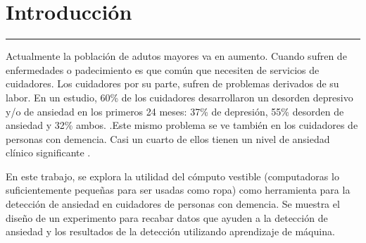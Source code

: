 
\chapter{Introducci\'on}\label{capit:cap1}
\vspace{-2.0325ex}%
\noindent
\rule{\textwidth}{0.5pt}
\vspace{-5.5ex}%
\newcommand{\pushline}{\Indp}


Actualmente la poblaci\'on de adutos mayores va en aumento. Cuando sufren de enfermedades o padecimiento es que com\'un que necesiten de servicios de cuidadores. Los cuidadores por su parte, sufren de problemas derivados de su labor. En un estudio, 60\% de los cuidadores desarrollaron un desorden depresivo y/o de ansiedad en los primeros 24 meses: 37\% de depresi\'on, 55\% desorden de ansiedad y 32\% ambos. \citep{Joling2014}.Este mismo problema se ve tambi\'en en los cuidadores de personas con demencia.  Casi un cuarto de ellos tienen un nivel de ansiedad cl\'inico significante \citep{Cooper200615}.

	En este trabajo, se explora la utilidad del c\'omputo vestible (computadoras lo suficientemente peque\~nas para ser usadas como ropa) como herramienta para la detecci\'on de ansiedad en cuidadores de personas con demencia. Se muestra el dise\~no de un experimento para recabar datos que ayuden a la detecci\'on de ansiedad y los resultados de la detecci\'on utilizando aprendizaje de m\'aquina.
	
	
	
	
	

	

